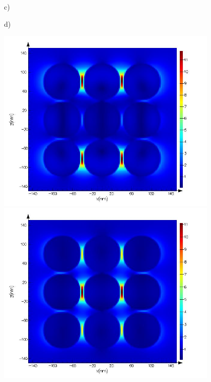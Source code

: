 \documentclass[a4paper]{article}
\begin{document}
\begin{figure}
\begin{minipage}[h]{0.49\textwidth}
  \end{minipage}
  \begin{minipage}[h]{0.49\textwidth}    \begin{flushleft}     c)    \end{flushleft}
  \end{minipage}
  \begin{minipage}[h]{0.49\textwidth}    \begin{flushleft}     d)   \end{flushleft}
  \end{minipage}
  \begin{minipage}[h]{0.49\textwidth} 
    \includegraphics[width=0.95\textwidth]{fdtd-field-408nm}
  \end{minipage}
  \begin{minipage}[h]{0.49\textwidth} 
    \includegraphics[width=0.95\textwidth]{fdtd-field-452nm}

\end{minipage}
\end{figure}
\end{document}
